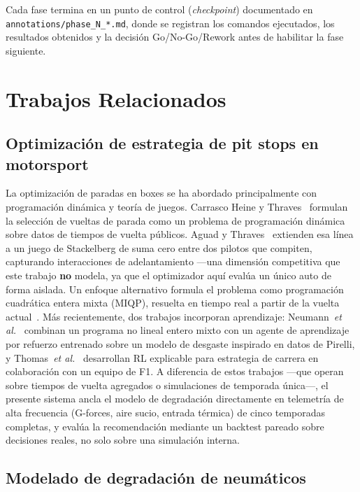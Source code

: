 \documentclass[conference]{IEEEtran}
\begin{document}
Cada fase termina en un punto de control (\emph{checkpoint}) documentado
en \texttt{annotations/phase\_N\_*.md}, donde se registran los comandos
ejecutados, los resultados obtenidos y la decisión Go/No-Go/Rework antes
de habilitar la fase siguiente.

\section{Trabajos Relacionados}

\subsection{Optimización de estrategia de pit stops en motorsport}

La optimización de paradas en boxes se ha abordado principalmente con
programación dinámica y teoría de juegos. Carrasco Heine y
Thraves~\cite{carrasco2023} formulan la selección de vueltas de parada como
un problema de programación dinámica sobre datos de tiempos de vuelta
públicos. Aguad y Thraves~\cite{aguad2024} extienden esa línea a un juego de
Stackelberg de suma cero entre dos pilotos que compiten, capturando
interacciones de adelantamiento —una dimensión competitiva que este trabajo
\textbf{no} modela, ya que el optimizador aquí evalúa un único auto de forma
aislada. Un enfoque alternativo formula el problema como programación
cuadrática entera mixta (MIQP), resuelta en tiempo real a partir de la vuelta
actual~\cite{miqp2024}. Más recientemente, dos trabajos incorporan
aprendizaje: Neumann~\emph{et al.}~\cite{neumann2025learning} combinan un
programa no lineal entero mixto con un agente de aprendizaje por refuerzo
entrenado sobre un modelo de desgaste inspirado en datos de Pirelli, y
Thomas~\emph{et al.}~\cite{thomas2025rl} desarrollan RL explicable para
estrategia de carrera en colaboración con un equipo de F1. A diferencia de
estos trabajos —que operan sobre tiempos de vuelta agregados o simulaciones
de temporada única—, el presente sistema ancla el modelo de degradación
directamente en telemetría de alta frecuencia (G-forces, aire sucio, entrada
térmica) de cinco temporadas completas, y evalúa la recomendación mediante un
backtest pareado sobre decisiones reales, no solo sobre una simulación
interna.

\subsection{Modelado de degradación de neumáticos}
\end{document}

